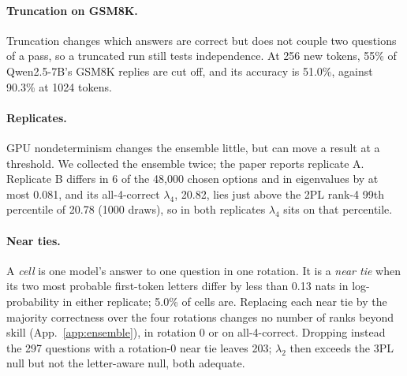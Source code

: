 \documentclass{article}
\theoremstyle{plain}
\theoremstyle{remark}
\begin{document}
\paragraph{Truncation on GSM8K.} Truncation changes which answers are
correct but does not couple two questions of a pass, so a truncated run
still tests independence. At 256 new tokens, 55\% of Qwen2.5-7B's GSM8K
replies are cut off, and its accuracy is 51.0\%, against 90.3\% at 1024
tokens.

\paragraph{Replicates.} GPU nondeterminism changes the ensemble little, but can
move a result at a threshold. We collected the ensemble twice; the paper
reports replicate A. Replicate B differs
in 6 of the 48{,}000 chosen options and in eigenvalues by at most 0.081,
and its all-4-correct $\lambda_4$, 20.82, lies just above the 2PL
rank-4 99th percentile of 20.78 (1000 draws), so in both replicates
$\lambda_4$ sits on that percentile.

\paragraph{Near ties.} A \emph{cell} is one model's answer to one
question in one rotation. It is a \emph{near tie} when its two most
probable first-token letters differ by less than 0.13 nats in
log-probability in either replicate; 5.0\% of cells are. Replacing each
near tie by the majority correctness over the four rotations changes no
number of ranks beyond skill (App.~\ref{app:ensemble}), in rotation 0
or on all-4-correct. Dropping instead the 297 questions with a rotation-0 near tie
leaves 203; $\lambda_2$ then exceeds the 3PL null but not the
letter-aware null, both adequate.
\end{document}
